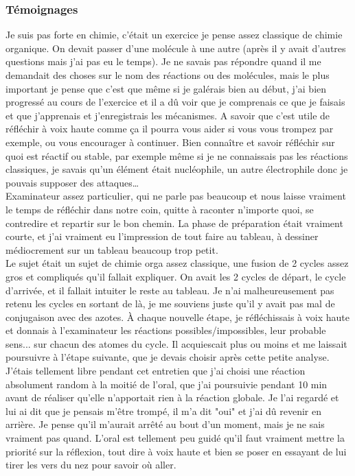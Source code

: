 \subsubsection{Témoignages}

\lettrine{{\color{violet} \oldpilcrowfive}}{}
Je suis pas forte en chimie, c’était un exercice je pense assez classique de chimie organique. On
devait passer d’une molécule à une autre (après il y avait d’autres questions mais j’ai pas eu le
temps). Je ne savais pas répondre quand il me demandait des choses sur le nom des réactions ou des
molécules, mais le plus important je pense que c’est que même si je galérais bien au début, j’ai bien
progressé au cours de l’exercice et il a dû voir que je comprenais ce que je faisais et que j’apprenais
et j’enregistrais les mécanismes. A savoir que c’est utile de réfléchir à voix haute comme ça il pourra
vous aider si vous vous trompez par exemple, ou vous encourager à continuer. Bien connaître et
savoir réfléchir sur quoi est réactif ou stable, par exemple même si je ne connaissais pas les réactions
classiques, je savais qu’un élément était nucléophile, un autre électrophile donc je pouvais supposer
des attaques…\\

\lettrine{{\color{yellow!80!black} \oldpilcrowfive}}{}
Examinateur assez particulier, qui ne parle pas beaucoup et nous laisse vraiment le temps de réfléchir dans notre coin, quitte à raconter n'importe quoi, se contredire et repartir sur le bon chemin. La phase de préparation était vraiment courte, et j'ai vraiment eu l'impression de tout faire au tableau, à dessiner médiocrement sur un tableau beaucoup trop petit. \\

Le sujet était un sujet de chimie orga assez classique, une fusion de 2 cycles assez gros et compliqués qu'il fallait expliquer. On avait les 2 cycles de départ, le cycle d'arrivée, et il fallait intuiter le reste au tableau. Je n'ai malheureusement pas retenu les cycles en sortant de là, je me souviens juste qu'il y avait pas mal de conjugaison avec des azotes. À chaque nouvelle étape, je réfléchissais à voix haute et donnais à l'examinateur les réactions possibles/impossibles, leur probable sens... sur chacun des atomes du cycle. Il acquiescait plus ou moins et me laissait poursuivre à l'étape suivante, que je devais choisir après cette petite analyse.\\

J'étais tellement libre pendant cet entretien que j'ai choisi une réaction absolument random à la moitié de l'oral, que j'ai poursuivie pendant 10 min avant de réaliser qu'elle n'apportait rien à la réaction globale. Je l'ai regardé et lui ai dit que je pensais m'être trompé, il m'a dit "oui" et j'ai dû revenir en arrière. Je pense qu'il m'aurait arrêté au bout d'un moment, mais je ne sais vraiment pas quand. L'oral est tellement peu guidé qu'il faut vraiment mettre la priorité sur la réflexion, tout dire à voix haute et bien se poser en essayant de lui tirer les vers du nez pour savoir où aller.\\

